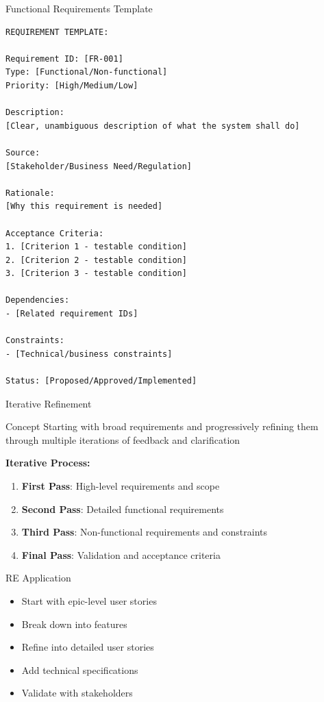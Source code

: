 \documentclass{beamer}
\begin{document}
\begin{frame}[fragile]{Functional Requirements Template}
    \begin{lstlisting}[style=code, caption={Structured Requirements Template}]
REQUIREMENT TEMPLATE:

Requirement ID: [FR-001]
Type: [Functional/Non-functional]
Priority: [High/Medium/Low]

Description: 
[Clear, unambiguous description of what the system shall do]

Source:
[Stakeholder/Business Need/Regulation]

Rationale:
[Why this requirement is needed]

Acceptance Criteria:
1. [Criterion 1 - testable condition]
2. [Criterion 2 - testable condition]
3. [Criterion 3 - testable condition]

Dependencies:
- [Related requirement IDs]

Constraints:
- [Technical/business constraints]

Status: [Proposed/Approved/Implemented]
    \end{lstlisting}
\end{frame}

\begin{frame}{Iterative Refinement}
    \begin{block}{Concept}
        Starting with broad requirements and progressively refining them through multiple iterations of feedback and clarification
    \end{block}
    
    \textbf{Iterative Process:}
    \begin{enumerate}
        \item \textbf{First Pass}: High-level requirements and scope
        \item \textbf{Second Pass}: Detailed functional requirements
        \item \textbf{Third Pass}: Non-functional requirements and constraints
        \item \textbf{Final Pass}: Validation and acceptance criteria
    \end{enumerate}
    
    \begin{exampleblock}{RE Application}
        \begin{itemize}
            \item Start with epic-level user stories
            \item Break down into features
            \item Refine into detailed user stories
            \item Add technical specifications
            \item Validate with stakeholders
        \end{itemize}
    \end{exampleblock}
\end{frame}
\end{document}
